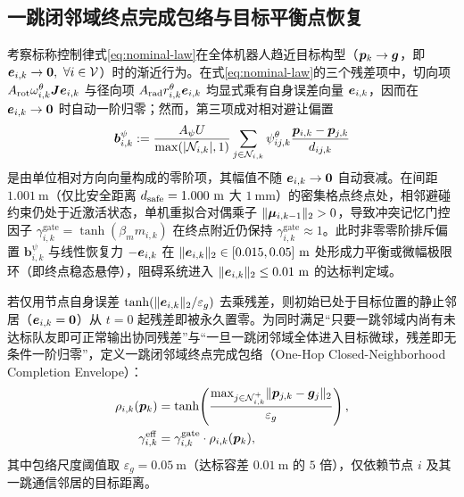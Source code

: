 \subsection{一跳闭邻域终点完成包络与目标平衡点恢复}\label{subsec:envelope}
考察标称控制律式\eqref{eq:nominal-law}在全体机器人趋近目标构型（$\boldsymbol{p}_k\to\boldsymbol{g}$，即 $\boldsymbol{e}_{i,k}\to\boldsymbol 0,\ \forall i\in\mathcal V$）时的渐近行为。在式\eqref{eq:nominal-law}的三个残差项中，切向项 $A_{\mathrm{rot}}\omega_{i,k}^\theta\boldsymbol{J}\boldsymbol{e}_{i,k}$ 与径向项 $A_{\mathrm{rad}}r_{i,k}^\theta\boldsymbol{e}_{i,k}$ 均显式乘有自身误差向量 $\boldsymbol{e}_{i,k}$，因而在 $\boldsymbol{e}_{i,k}\to\boldsymbol 0$ 时自动一阶归零；然而，第三项成对相对避让偏置
\begin{equation}
 \boldsymbol b_{i,k}^\psi := \frac{A_\psi U}{\max(|\mathcal N_{i,k}|,1)}\sum_{j\in\mathcal N_{i,k}}\psi_{ij,k}^\theta\frac{\boldsymbol{p}_{i,k}-\boldsymbol{p}_{j,k}}{d_{ij,k}}
\end{equation}
是由单位相对方向向量构成的零阶项，其幅值不随 $\boldsymbol{e}_{i,k}\to\boldsymbol 0$ 自动衰减。在间距 $1.001\ \mathrm m$（仅比安全距离 $d_{\mathrm{safe}}=1.000\ \mathrm m$ 大 $1\ \mathrm{mm}$）的密集格点终点处，相邻避碰约束仍处于近激活状态，单机重拟合对偶乘子 $\lVert\boldsymbol\mu_{i,k-1}\rVert_2>0$，导致冲突记忆门控因子 $\gamma_{i,k}^{\mathrm{gate}}=\tanh(\beta_m m_{i,k})$ 在终点附近仍保持 $\gamma_{i,k}^{\mathrm{gate}}\approx 1$。此时非零零阶排斥偏置 $\boldsymbol b_{i,k}^\psi$ 与线性恢复力 $-\boldsymbol{e}_{i,k}$ 在 $\lVert\boldsymbol{e}_{i,k}\rVert_2\in[0.015,0.05]\ \mathrm m$ 处形成力平衡或微幅极限环（即终点稳态悬停），阻碍系统进入 $\lVert\boldsymbol{e}_{i,k}\rVert_2\le 0.01\ \mathrm m$ 的达标判定域。

若仅用节点自身误差 $\tanh(\lVert\boldsymbol{e}_{i,k}\rVert_2/\varepsilon_g)$ 去乘残差，则初始已处于目标位置的静止邻居（$\boldsymbol{e}_{i,k}=\boldsymbol 0$）从 $t=0$ 起残差即被永久置零。为同时满足“只要一跳邻域内尚有未达标队友即可正常输出协同残差”与“一旦一跳闭邻域全体进入目标微球，残差即无条件一阶归零”，定义一跳闭邻域终点完成包络（One-Hop Closed-Neighborhood Completion Envelope）：
\begin{equation}
\begin{split}
 \rho_{i,k}(\boldsymbol{p}_k)&=\tanh\!\left(\frac{\max_{j\in\mathcal N_{i,k}^+}\lVert\boldsymbol{p}_{j,k}-\boldsymbol{g}_j\rVert_2}{\varepsilon_g}\right),\\
 \gamma_{i,k}^{\mathrm{eff}} &= \gamma_{i,k}^{\mathrm{gate}}\cdot\rho_{i,k}(\boldsymbol{p}_k),
\end{split}
 \label{eq:envelope-def}
\end{equation}
其中包络尺度阈值取 $\varepsilon_g=0.05\ \mathrm m$（达标容差 $0.01\ \mathrm m$ 的 $5$ 倍），仅依赖节点 $i$ 及其一跳通信邻居的目标距离。

